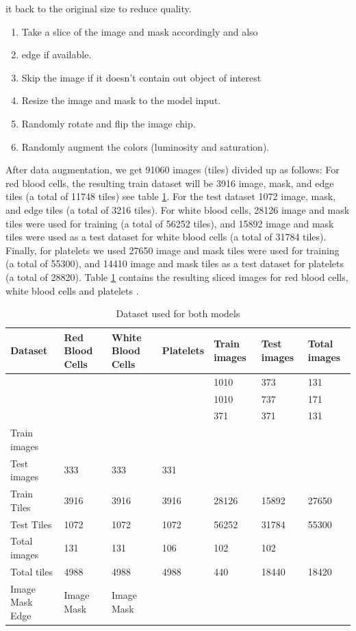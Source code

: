 \documentclass[conference]{IEEEtran}
\begin{document}
it back to the original size to reduce quality.
\begin{enumerate}
\item Take a slice of the image and mask accordingly and also
\item edge if available.
\item Skip the image if it doesn’t contain out object of interest
\item Resize the image and mask to the model input.
\item Randomly rotate and flip the image chip.
\item Randomly augment the colors (luminosity and saturation).
\end{enumerate}
After data augmentation, we get 91060 images (tiles) divided up as follows: For red blood cells, the resulting train dataset will be 3916 image, mask, and edge tiles (a total of 11748 tiles) see table \ref{tab:II}. For the test dataset 1072 image, mask, and edge tiles (a total of 3216 tiles). For white blood cells, 28126 image and mask tiles were used for training (a total of 56252 tiles), and 15892 image and mask tiles were used as a test dataset for white blood cells (a total of 31784 tiles). Finally, for platelets we used 27650 image and mask tiles were used for training (a total of 55300), and 14410 image and mask tiles as a test dataset for platelets (a total of 28820). Table \ref{tab:II} contains the resulting sliced images for red blood cells, white blood cells and platelets .
\begin{table}[htbp]
\centering
\caption{Dataset used for both models}
\label{tab:II}
\begin{tabular}{lllllll}
\hline
Dataset & Red Blood Cells & White Blood Cells & Platelets & Train images & Test images & Total images \\
\hline
& & & & 1010 & 373 & 131 \\
& & & & 1010 & 737 & 171 \\
& & & & 371 & 371 & 131 \\
Train images & & & & & & \\
Test images & 333 & 333 & 331 & & & \\
Train Tiles & 3916 & 3916 & 3916 & 28126 & 15892 & 27650 \\
Test Tiles & 1072 & 1072 & 1072 & 56252 & 31784 & 55300 \\
Total images & 131 & 131 & 106 & 102 & 102 & \\
Total tiles & 4988 & 4988 & 4988 & 440 & 18440 & 18420 \\
Image Mask Edge & Image Mask & Image Mask & & & & \\
\hline
\end{tabular}
\end{table}
\end{document}
